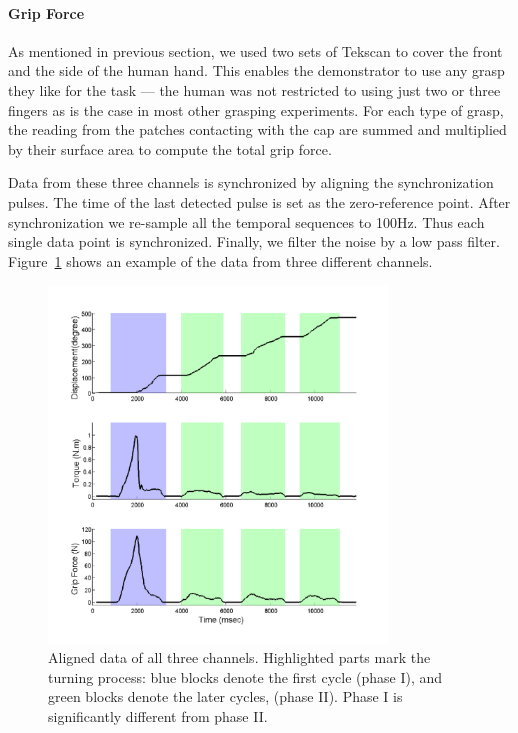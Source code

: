 \paragraph{\textbf{Grip Force}}
\label{tekscan}
As mentioned in previous section, we used two sets of Tekscan to cover
the front and the side of the human hand. This enables the
demonstrator to use any grasp they like for the task --- the human was
not restricted to using just two or three fingers as is the case in
most other grasping experiments. For each type of grasp, the reading
from the patches contacting with the cap are summed and multiplied by
their surface area to compute the total grip force. %


Data from these three channels is synchronized by aligning the
synchronization pulses. The time of the last detected pulse is set as
the zero-reference point. After synchronization we re-sample all the
temporal sequences to 100Hz. Thus each single data point is
synchronized. Finally, we filter the noise by a low pass
filter. Figure~\ref{fig:3channels} shows an example of the data from
three different channels.



\begin{figure}
  \centering
  \hspace{-0.5cm}
  \includegraphics[width=9cm]{./fig/b3c2_1_sTF.pdf}
  \vspace{-0.5cm}
  \caption{ \scriptsize{Aligned data of all three
      channels. Highlighted parts mark the turning process: blue
      blocks denote the first cycle (phase I), and green
      blocks denote the later cycles, (phase II). Phase I is
      significantly different from phase II.} 
}
\label{fig:3channels}
\end{figure}

